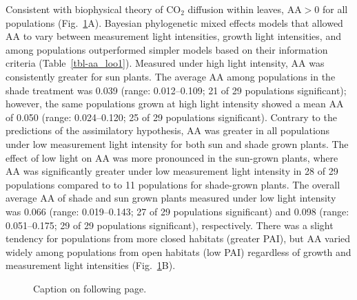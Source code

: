\documentclass[
  letterpaper,
  DIV=11,
  numbers=noendperiod]{scrartcl}
\newcommand{\aax}{$\mathrm{AA}$}
\newcommand{\aay}{\mathrm{AA}}
\begin{document}
Consistent with biophysical theory of CO\(_2\) diffusion within leaves,
\(\aay{} > 0\) for all populations (Fig.~\ref{fig-aa}A). Bayesian
phylogenetic mixed effects models that allowed \aax{} to vary between
measurement light intensities, growth light intensities, and among
populations outperformed simpler models based on their information
criteria (Table~\ref{tbl-aa_loo1}). Measured under high light intensity,
\aax{} was consistently greater for sun plants. The average \aax{} among
populations in the shade treatment was 0.039 (range: 0.012--0.109; 21 of
29 populations significant); however, the same populations grown at high
light intensity showed a mean \aax{} of 0.050 (range: 0.024--0.120; 25
of 29 populations significant). Contrary to the predictions of the
assimilatory hypothesis, \aax{} was greater in all populations under low
measurement light intensity for both sun and shade grown plants. The
effect of low light on \aax{} was more pronounced in the sun-grown
plants, where \aax{} was significantly greater under low measurement
light intensity in 28 of 29 populations compared to to 11 populations
for shade-grown plants. The overall average \aax{} of shade and sun
grown plants measured under low light intensity was 0.066 (range:
0.019--0.143; 27 of 29 populations significant) and 0.098 (range:
0.051--0.175; 29 of 29 populations significant), respectively. There was
a slight tendency for populations from more closed habitats (greater
PAI), but \aax{} varied widely among populations from open habitats (low
PAI) regardless of growth and measurement light intensities
(Fig.~\ref{fig-aa}B).

\begin{figure}


\caption{\label{fig-aa}Caption on following page.}

\end{figure}%

\addtocounter{figure}{-1}
\end{document}
